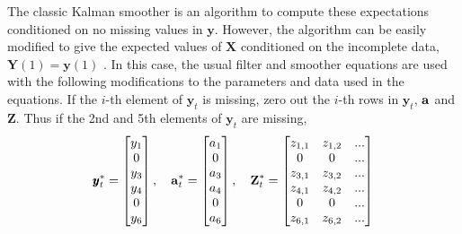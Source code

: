 \documentclass[]{article}
\def\XI{\mbox{\boldmath $\Xi$}}
\def\XX{\mbox{$\pmb{X}$}}	\def\xx{\mbox{$\pmb{x}$}}
\def\YY{\mbox{$\pmb{Y}$}}	\def\yy{\mbox{$\pmb{y}$}}
\def\ZZ{\mbox{$\mathbf Z$}}	\def\zz{\mbox{$\mathbf z$}}	\def\Zb{\mbox{$\mathbf M$}} \def\Za{\mbox{$\mathbf N$}} \def\Zm{\XI}
\begin{document}
The classic Kalman smoother is an algorithm to compute these expectations conditioned on no missing values in $\yy$. However, the algorithm  can be easily modified to give the expected values of $\XX$ conditioned on the incomplete data, $\YY(1)=\yy(1)$ \citep[section 6.4, eqn 6.78, p. 348]{ShumwayStoffer2006}.  
In this case, the usual filter and smoother equations are used with the following modifications to the parameters and data used in the equations.  If the $i$-th element of $\yy_t$ is missing, zero out the $i$-th rows in $\yy_t$, $\aa$ and $\ZZ$.  Thus if the 2nd and 5th elements of $\yy_t$ are missing,
\begin{equation}\label{eq:yaZ.miss}
\yy_t^*=\begin{bmatrix}
y_1\\
0\\
y_3\\
y_4\\
0\\
y_6\\
\end{bmatrix}, \quad
\aa_t^*=\begin{bmatrix}
a_1\\
0\\
a_3\\
a_4\\
0\\
a_6\\
\end{bmatrix}, \quad
\ZZ_t^*=\begin{bmatrix}
z_{1,1}&z_{1,2}&...\\
0&0&...\\
z_{3,1}&z_{3,2}&...\\
z_{4,1}&z_{4,2}&...\\
0&0&...\\
z_{6,1}&z_{6,2}&...\\
\end{bmatrix}
\end{equation}
\end{document}
